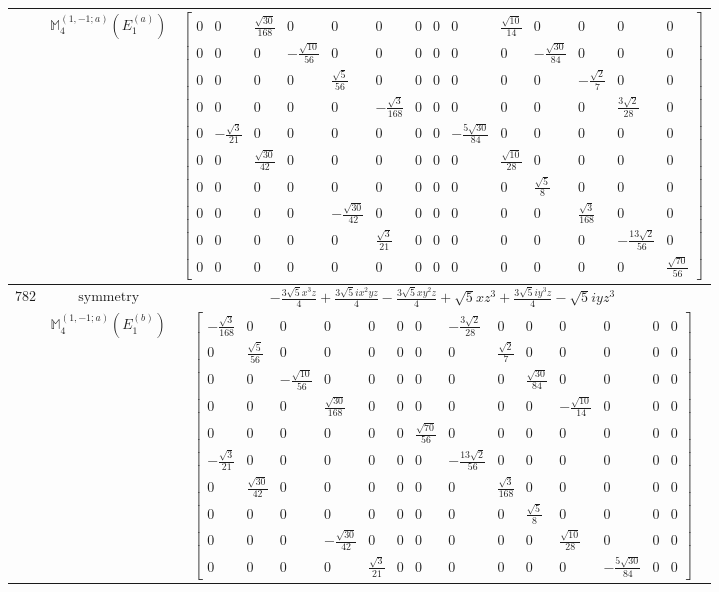 \documentclass[fleqn,8pt,landscape]{jsarticle}
\begin{document}
\begin{longtable}{ccc}
$  $ & $ \mathbb{M}_{4}^{(1,-1;a)}(E_{1}^{(a)}) $ & $ \begin{bmatrix} 0 & 0 & \frac{\sqrt{30}}{168} & 0 & 0 & 0 & 0 & 0 & 0 & \frac{\sqrt{10}}{14} & 0 & 0 & 0 & 0 \\ 0 & 0 & 0 & - \frac{\sqrt{10}}{56} & 0 & 0 & 0 & 0 & 0 & 0 & - \frac{\sqrt{30}}{84} & 0 & 0 & 0 \\ 0 & 0 & 0 & 0 & \frac{\sqrt{5}}{56} & 0 & 0 & 0 & 0 & 0 & 0 & - \frac{\sqrt{2}}{7} & 0 & 0 \\ 0 & 0 & 0 & 0 & 0 & - \frac{\sqrt{3}}{168} & 0 & 0 & 0 & 0 & 0 & 0 & \frac{3 \sqrt{2}}{28} & 0 \\ 0 & - \frac{\sqrt{3}}{21} & 0 & 0 & 0 & 0 & 0 & 0 & - \frac{5 \sqrt{30}}{84} & 0 & 0 & 0 & 0 & 0 \\ 0 & 0 & \frac{\sqrt{30}}{42} & 0 & 0 & 0 & 0 & 0 & 0 & \frac{\sqrt{10}}{28} & 0 & 0 & 0 & 0 \\ 0 & 0 & 0 & 0 & 0 & 0 & 0 & 0 & 0 & 0 & \frac{\sqrt{5}}{8} & 0 & 0 & 0 \\ 0 & 0 & 0 & 0 & - \frac{\sqrt{30}}{42} & 0 & 0 & 0 & 0 & 0 & 0 & \frac{\sqrt{3}}{168} & 0 & 0 \\ 0 & 0 & 0 & 0 & 0 & \frac{\sqrt{3}}{21} & 0 & 0 & 0 & 0 & 0 & 0 & - \frac{13 \sqrt{2}}{56} & 0 \\ 0 & 0 & 0 & 0 & 0 & 0 & 0 & 0 & 0 & 0 & 0 & 0 & 0 & \frac{\sqrt{70}}{56} \end{bmatrix} $ \\ \hline
$ 782 $ & $ \text{symmetry} $ & $ - \frac{3 \sqrt{5} x^{3} z}{4} + \frac{3 \sqrt{5} i x^{2} y z}{4} - \frac{3 \sqrt{5} x y^{2} z}{4} + \sqrt{5} x z^{3} + \frac{3 \sqrt{5} i y^{3} z}{4} - \sqrt{5} i y z^{3} $ \\
$  $ & $ \mathbb{M}_{4}^{(1,-1;a)}(E_{1}^{(b)}) $ & $ \begin{bmatrix} - \frac{\sqrt{3}}{168} & 0 & 0 & 0 & 0 & 0 & 0 & - \frac{3 \sqrt{2}}{28} & 0 & 0 & 0 & 0 & 0 & 0 \\ 0 & \frac{\sqrt{5}}{56} & 0 & 0 & 0 & 0 & 0 & 0 & \frac{\sqrt{2}}{7} & 0 & 0 & 0 & 0 & 0 \\ 0 & 0 & - \frac{\sqrt{10}}{56} & 0 & 0 & 0 & 0 & 0 & 0 & \frac{\sqrt{30}}{84} & 0 & 0 & 0 & 0 \\ 0 & 0 & 0 & \frac{\sqrt{30}}{168} & 0 & 0 & 0 & 0 & 0 & 0 & - \frac{\sqrt{10}}{14} & 0 & 0 & 0 \\ 0 & 0 & 0 & 0 & 0 & 0 & \frac{\sqrt{70}}{56} & 0 & 0 & 0 & 0 & 0 & 0 & 0 \\ - \frac{\sqrt{3}}{21} & 0 & 0 & 0 & 0 & 0 & 0 & - \frac{13 \sqrt{2}}{56} & 0 & 0 & 0 & 0 & 0 & 0 \\ 0 & \frac{\sqrt{30}}{42} & 0 & 0 & 0 & 0 & 0 & 0 & \frac{\sqrt{3}}{168} & 0 & 0 & 0 & 0 & 0 \\ 0 & 0 & 0 & 0 & 0 & 0 & 0 & 0 & 0 & \frac{\sqrt{5}}{8} & 0 & 0 & 0 & 0 \\ 0 & 0 & 0 & - \frac{\sqrt{30}}{42} & 0 & 0 & 0 & 0 & 0 & 0 & \frac{\sqrt{10}}{28} & 0 & 0 & 0 \\ 0 & 0 & 0 & 0 & \frac{\sqrt{3}}{21} & 0 & 0 & 0 & 0 & 0 & 0 & - \frac{5 \sqrt{30}}{84} & 0 & 0 \end{bmatrix} $ \\ \hline

\end{longtable}
\end{document}
